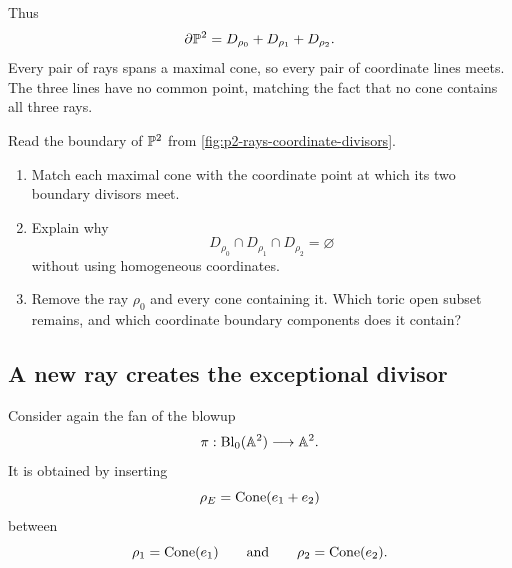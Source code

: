 Thus
\[
\partial\PP^2
=
D_{\rho_0}+D_{\rho_1}+D_{\rho_2}.
\]
Every pair of rays spans a maximal cone, so every pair of coordinate
lines meets. The three lines have no common point, matching the fact
that no cone contains all three rays.

\begin{surfacelaboratory}
Read the boundary of \(\PP^2\) from
\cref{fig:p2-rays-coordinate-divisors}.

\begin{enumerate}[label=(\alph*),wide=0pt]
\item Match each maximal cone with the coordinate point at which its
two boundary divisors meet.

\item Explain why
\[
D_{\rho_0}\cap D_{\rho_1}\cap D_{\rho_2}
=
\varnothing
\]
without using homogeneous coordinates.

\item Remove the ray \(\rho_0\) and every cone containing it. Which
toric open subset remains, and which coordinate boundary components
does it contain?
\end{enumerate}
\end{surfacelaboratory}

\subsection{A new ray creates the exceptional divisor}

Consider again the fan of the blowup
\[
\pi:\Blp{\AAA^2}{0}\longrightarrow\AAA^2.
\]
It is obtained by inserting
\[
\rho_E=\Cone{e_1+e_2}
\]
between
\[
\rho_1=\Cone{e_1}
\qquad\text{and}\qquad
\rho_2=\Cone{e_2}.
\]


